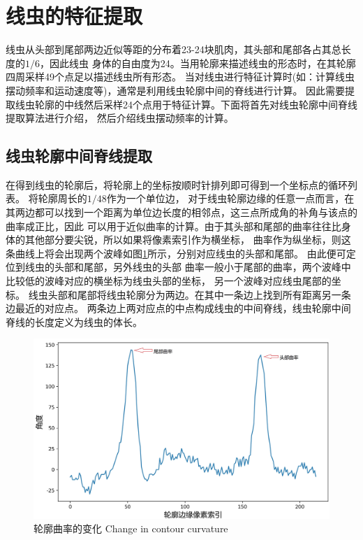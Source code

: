 \section{线虫的特征提取}
	线虫从头部到尾部两边近似等距的分布着23-24块肌肉，其头部和尾部各占其总长度的$1/6$，因此线虫
	身体的自由度为24。当用轮廓来描述线虫的形态时，在其轮廓四周采样49个点足以描述线虫所有形态。
	当对线虫进行特征计算时(如：计算线虫摆动频率和运动速度等)，通常是利用线虫轮廓中间的脊线进行计算。
	因此需要提取线虫轮廓的中线然后采样24个点用于特征计算。下面将首先对线虫轮廓中间脊线提取算法进行介绍，
	然后介绍线虫摆动频率的计算。
\subsection{线虫轮廓中间脊线提取}
	在得到线虫的轮廓后，将轮廓上的坐标按顺时针排列即可得到一个坐标点的循环列表。
	将轮廓周长的$1/48$作为一个单位边，
	对于线虫轮廓边缘的任意一点而言，在其两边都可以找到一个距离为单位边长度的相邻点，这三点所成角的补角与该点的曲率成正比，因此
	可以用于近似曲率的计算。由于其头部和尾部的曲率往往比身体的其他部分要尖锐，所以如果将像素索引作为横坐标，
	曲率作为纵坐标，则这条曲线上将会出现两个波峰如图\ref{fig:qulv}所示，分别对应线虫的头部和尾部。
	由此便可定位到线虫的头部和尾部，另外线虫的头部
	曲率一般小于尾部的曲率，两个波峰中比较低的波峰对应的横坐标为线虫头部的坐标，
	另一个波峰对应线虫尾部的坐标。
	线虫头部和尾部将线虫轮廓分为两边。在其中一条边上找到所有距离另一条边最近的对应点。
	两条边上两对应点的中点构成线虫的中间脊线，线虫轮廓中间脊线的长度定义为线虫的体长。
	\begin{figure}[h]
	  \centering
	  \includegraphics[width=14cm]{figure/chap5/cuvature.jpg}
	  \bicaption
		{轮廓曲率的变化}
		{Change in contour curvature}
	  \label{fig:qulv}
	\end{figure}
